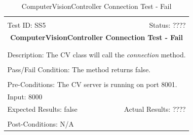 \documentclass[11pt]{article}
\begin{document}
\begin{center}
\begin{table}[H]
\begin{tabular}{|l r|}\hline&\\[-2mm]
	Test ID: SS5	&Status: ????\\[-3mm]
	\multicolumn{2}{|c|}{\textbf{\large{ComputerVisionController Connection Test - Fail}}}\\&\\\hline&\\[-3mm]
	\multicolumn{2}{|p{\textwidth}|}{Description: The CV class will call the \textit{connection} method.}\\[1mm]\hline&\\[-3mm]
	\multicolumn{2}{|p{\textwidth}|}{Pass/Fail Condition: The method returns false.}\\[1mm]\hline&\\[-3mm]
	\multicolumn{2}{|p{\textwidth}|}{Pre-Conditions: The CV server is running on port 8001.}\\[4mm]
	\multicolumn{2}{|p{\textwidth}|}{Input: 8000}\\[2mm]\hline
	\multicolumn{1}{|p{0.49\textwidth}}{Expected Results: false}	&\multicolumn{1}{|p{0.45\textwidth}|}{Actual Results: ????}\\\hline&\\[-3mm]
	\multicolumn{2}{|p{\textwidth}|}{Post-Conditions: N/A}\\\hline
\end{tabular}
\caption{ComputerVisionController Connection Test - Fail}
\end{table}
\end{center}
\end{document}
